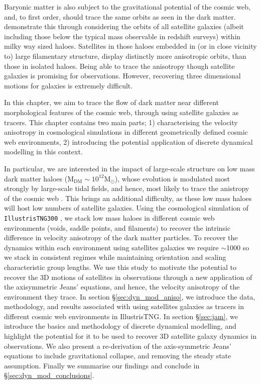 Baryonic matter is also subject to the gravitational potential of the cosmic web, and, to first order, should trace the same orbits as seen in the dark matter. \citep[][]{garaldi2018} demonstrate this through considering the orbits of all satellite galaxies (albeit including those below the typical mass observable in redshift surveys) within milky way sized haloes. Satellites in those haloes embedded in (or in close vicinity to) large filamentary structure, display distinctly more anisotropic orbits, than those in isolated haloes. Being able to trace the anisotropy though satellite galaxies is promising for observations. However, recovering three dimensional motions for galaxies is extremely difficult.

In this chapter, we aim to trace the flow of dark matter near different morphological features of the cosmic web, through using satellite galaxies as tracers. This chapter contains two main parts; 1) characterising the velocity anisotropy in cosmological simulations in different geometrically defined cosmic web environments, 2) introducing the potential application of discrete dynamical modelling in this context.

In particular, we are interested in the impact of large-scale structure on low mass dark matter haloes ($\mathrm{M_{DM} \sim 10^{12}M_{\odot}}$), whose evolution is modulated most strongly by large-scale tidal fields, and hence, most likely to trace the anistropy of the cosmic web \citep[e.g.][]{tojeiro2017}. This brings an additional difficulty, as these low mass haloes will host low numbers of satellite galaxies. Using the cosmological simulation of \texttt{IllustrisTNG300} , we stack low mass haloes in different cosmic web environments (voids, saddle points, and filaments) to recover the intrinsic difference in velocity anisotropy of the dark matter particles. To recover the dynamics within each environment using satellites galaxies we require $\sim$1000 so we stack in consistent regimes while maintaining orientation and scaling characteristic group lengths. We use this study to motivate the potential to recover the 3D motions of satellites in observations through a new application of the axisymmetric Jeans' equations, and hence, the velocity anisotropy of the environment they trace. In section \S\ref{sec:dyn_mod_aniso}, we introduce the data, methodology, and results associated with using satellites galaxies as tracers in different cosmic web environments in IllustrisTNG. In section \S\ref{sec:jam}, we introduce the basics and methodology of discrete dynamical modelling, and highlight the potential for it to be used to recover 3D satellite galaxy dynamics in observations. We also present a re-derivation of the axis-symmetric Jeans' equations to include gravitational collapse, and removing the steady state assumption. Finally we summarise our findings and conclude in \S\ref{sec:dyn_mod_conclusions}.

